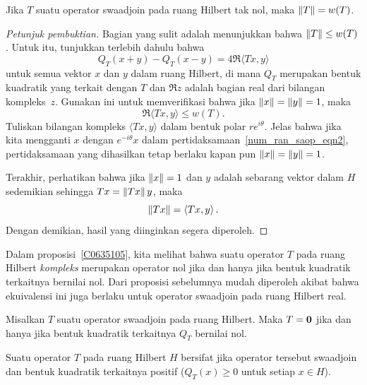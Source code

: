 \begin{prop} Jika $T$ suatu operator swaadjoin pada ruang Hilbert tak nol, maka $\lVert T\rVert = w(T)$.
\end{prop}

\begin{proof}[\emph{Petunjuk pembuktian}] Bagian yang sulit adalah menunjukkan bahwa $\lVert T\rVert \le w(T)$.  Untuk itu, tunjukkan terlebih dahulu bahwa
   \begin{equation}
             Q_T(x + y) - Q_T(x - y) =   4 \Re\langle Tx,y \rangle
   \end{equation}
untuk semua vektor $x$ dan $y$ dalam ruang Hilbert, di mana $Q_T$ merupakan bentuk kuadratik yang terkait dengan $T$ dan $\Re z$ adalah
bagian real dari bilangan kompleks~$z$.  Gunakan ini untuk memverifikasi bahwa jika $\lVert x\rVert = \lVert y\rVert = 1$, maka
   \begin{equation}\label{num_ran_saop_eqn2}
           \Re\langle Tx,y \rangle \le w(T).
   \end{equation}
Tuliskan bilangan kompleks $\langle Tx,y \rangle$ dalam bentuk polar $re^{i\theta}$.  Jelas bahwa jika kita mengganti
$x$ dengan $e^{-i\theta}x$ dalam pertidaksamaan~\eqref{num_ran_saop_eqn2}, pertidaksamaan yang dihasilkan tetap berlaku kapan pun $\lVert x\rVert = \lVert y\rVert = 1$.

Terakhir, perhatikan bahwa jika $\lVert x\rVert = 1$ dan $y$ adalah sebarang vektor dalam $H$ sedemikian sehingga $Tx = \lVert Tx\rVert\,y$, maka
   \begin{equation}
             \lVert Tx\rVert = \langle Tx,y \rangle\,.
   \end{equation}
Dengan demikian, hasil yang diinginkan segera diperoleh.         \ns
\end{proof}

Dalam proposisi~\ref{C0635105}, kita melihat bahwa suatu operator $T$ pada ruang Hilbert \emph{kompleks} merupakan operator nol jika dan hanya jika
bentuk kuadratik terkaitnya bernilai nol.  Dari proposisi sebelumnya mudah diperoleh akibat bahwa ekuivalensi ini juga berlaku
untuk operator swaadjoin pada ruang Hilbert real.

\begin{cor}\label{real_HSp_zero_Qform} Misalkan $T$ suatu operator swaadjoin pada ruang Hilbert.  Maka $T = \mathbf{0}$ jika dan
hanya jika bentuk kuadratik terkaitnya $Q_T$ bernilai nol.
\end{cor}

\begin{defn} Suatu operator $T$ pada ruang Hilbert $H$ bersifat
 jika operator tersebut swaadjoin dan bentuk kuadratik terkaitnya positif ($Q_T(x) \ge 0$ untuk setiap $x \in H$).
\end{defn}

